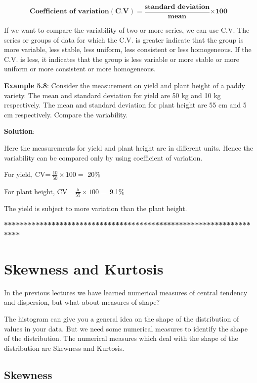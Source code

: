 \documentclass[
]{book}
\begin{document}
\[\mathbf{\text{Coefficient of variation}}\left( \mathbf{C}\mathbf{.}\mathbf{V} \right)\mathbf{=}\frac{\mathbf{\text{standard deviation}}}{\mathbf{\text{mean}}}\mathbf{\times 100}\]

If we want to compare the variability of two or more series, we can use
C.V. The series or groups of data for which the C.V. is greater indicate
that the group is more variable, less stable, less uniform, less
consistent or less homogeneous. If the C.V. is less, it indicates that
the group is less variable or more stable or more uniform or more
consistent or more homogeneous.

\textbf{Example 5.8}: Consider the measurement on yield and plant height of a
paddy variety. The mean and standard deviation for yield are 50 kg and
10 kg respectively. The mean and standard deviation for plant height are
55 cm and 5 cm respectively. Compare the variability.

\textbf{Solution}:

Here the measurements for yield and plant height are in different units.
Hence the variability can be compared only by using coefficient of
variation.

For yield, CV=\(\ \frac{10}{50} \times 100 =\) 20\%

For plant height, CV=
\(\frac{5}{55} \times 100 = \ \)9.1\%

The yield is subject to more variation than the plant height.

\textbf{******************************************************************}

\hypertarget{skewness-and-kurtosis}{%
\chapter{Skewness and Kurtosis}\label{skewness-and-kurtosis}}

In the previous lectures we have learned numerical measures of central
tendency and dispersion, but what about measures of shape?

The histogram can give you a general idea on the shape of the
distribution of values in your data. But we need some numerical measures
to identify the shape of the distribution. The numerical measures which
deal with the shape of the distribution are Skewness and Kurtosis.

\hypertarget{skewness}{%
\section{Skewness}\label{skewness}}
\end{document}
